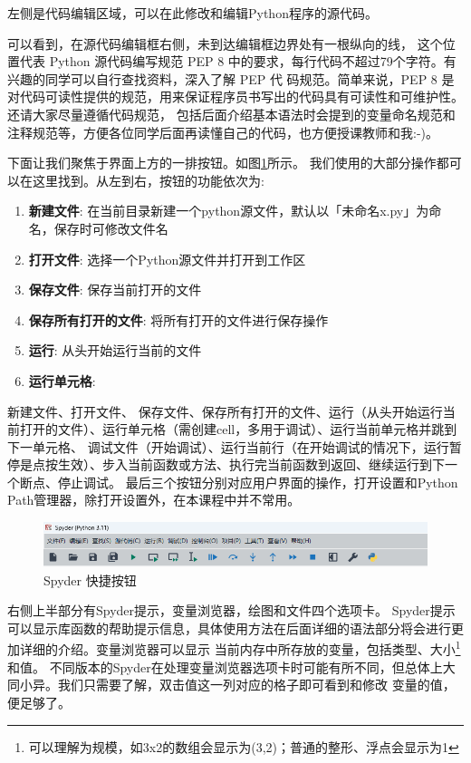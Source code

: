 \documentclass[UTF8]{ctexart}
\begin{document}
左侧是代码编辑区域，可以在此修改和编辑Python程序的源代码。

可以看到，在源代码编辑框右侧，未到达编辑框边界处有一根纵向的线，
这个位置代表 Python 源代码编写规范 PEP 8 中的要求，每行代码不超过79个字符。有兴趣的同学可以自行查找资料，深入了解 PEP 代
码规范。简单来说，PEP 8 是对代码可读性提供的规范，用来保证程序员书写出的代码具有可读性和可维护性。还请大家尽量遵循代码规范，
包括后面介绍基本语法时会提到的变量命名规范和注释规范等，方便各位同学后面再读懂自己的代码，也方便授课教师和我:-)。

下面让我们聚焦于界面上方的一排按钮。如图\ref{fig:spyderMain_buttons}所示。
我们使用的大部分操作都可以在这里找到。从左到右，按钮的功能依次为: 
\begin{enumerate}
    \item \textbf{新建文件}: 在当前目录新建一个python源文件，默认以「未命名x.py」为命名，保存时可修改文件名
    \item \textbf{打开文件}: 选择一个Python源文件并打开到工作区
    \item \textbf{保存文件}: 保存当前打开的文件
    \item \textbf{保存所有打开的文件}: 将所有打开的文件进行保存操作
    \item \textbf{运行}: 从头开始运行当前的文件
    \item \textbf{运行单元格}: 
\end{enumerate}
新建文件、打开文件、
保存文件、保存所有打开的文件、运行（从头开始运行当前打开的文件）、运行单元格（需创建cell，多用于调试）、运行当前单元格并跳到下一单元格、
调试文件（开始调试）、运行当前行（在开始调试的情况下，运行暂停是点按生效）、步入当前函数或方法、执行完当前函数到返回、继续运行到下一个断点、停止调试。
最后三个按钮分别对应用户界面的操作，打开设置和Python Path管理器，除打开设置外，在本课程中并不常用。

\begin{figure}[htbp]
    \centering
    \includegraphics*[width=0.7\linewidth]{pic/spyder主界面-快捷按钮.png}
    \caption{Spyder 快捷按钮}
    \label{fig:spyderMain_buttons}
\end{figure}


右侧上半部分有Spyder提示，变量浏览器，绘图和文件四个选项卡。
Spyder提示可以显示库函数的帮助提示信息，具体使用方法在后面详细的语法部分将会进行更加详细的介绍。变量浏览器可以显示
当前内存中所存放的变量，包括类型、大小\footnote{可以理解为规模，如3x2的数组会显示为(3,2)；普通的整形、浮点会显示为1}和值。
不同版本的Spyder在处理变量浏览器选项卡时可能有所不同，但总体上大同小异。我们只需要了解，双击值这一列对应的格子即可看到和修改
变量的值，便足够了。
\end{document}
